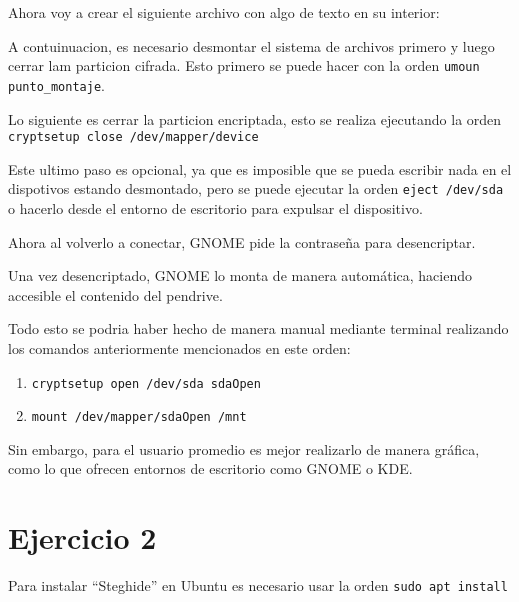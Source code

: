 \documentclass{article}
\begin{document}


Ahora voy a crear el siguiente archivo con algo de texto en su interior:


A contuinuacion, es necesario desmontar el sistema de archivos primero y luego cerrar lam particion cifrada. Esto primero se puede hacer con la orden \verb|umoun punto_montaje|.


Lo siguiente es cerrar la particion encriptada, esto se realiza ejecutando la orden \verb|cryptsetup close /dev/mapper/device|


Este ultimo paso es opcional, ya que es imposible que se pueda escribir nada en el dispotivos estando desmontado, pero se puede ejecutar la orden \verb|eject /dev/sda| o hacerlo desde el entorno de escritorio para expulsar el dispositivo.


Ahora al volverlo a conectar, GNOME pide la contraseña para desencriptar.


Una vez desencriptado, GNOME lo monta de manera automática, haciendo accesible el contenido del pendrive.



Todo esto se podria haber hecho de manera manual mediante terminal realizando los comandos anteriormente mencionados en este orden:

\begin{enumerate}
    \item \verb|cryptsetup open /dev/sda sdaOpen|
    \item \verb|mount /dev/mapper/sdaOpen /mnt|
\end{enumerate}

Sin embargo, para el usuario promedio es mejor realizarlo de manera gráfica, como lo que ofrecen entornos de escritorio como GNOME o KDE.

\section*{Ejercicio 2}

Para instalar ``Steghide'' en Ubuntu es necesario usar la orden \verb|sudo apt install|
\end{document}
